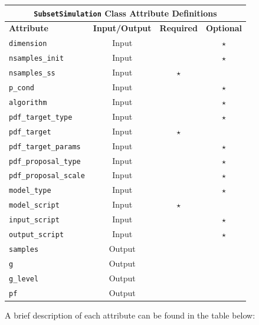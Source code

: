 \begin{center}
	\begin{tabular}{ |l|c|c|c| } 
				\hline
		\multicolumn{4}{|c|}{\texttt{SubsetSimulation} Class Attribute Definitions} \\
		\hline
		\textbf{Attribute} & \textbf{Input/Output} & \textbf{Required} & \textbf{Optional} \\
		\hline
		\texttt{dimension} & Input &  & $\star$  \\ 
		\hline
        \texttt{nsamples\_init}& Input &  &  $\star$  \\ 
		\hline
        \texttt{nsamples\_ss}& Input & $\star$ &    \\ 
		\hline
        \texttt{p\_cond}& Input &  &  $\star$  \\ 
		\hline
        \texttt{algorithm} & Input &  & $\star$  \\ 
		\hline
		\texttt{pdf\_target\_type}& Input &  &  $\star$  \\ 
		\hline
		\texttt{pdf\_target} & Input & $\star$ &   \\ 
		\hline
		\texttt{pdf\_target\_params} & Input  & &  $\star$  \\ 
		\hline
		\texttt{pdf\_proposal\_type} & Input & & $\star$   \\ 
		\hline
		\texttt{pdf\_proposal\_scale} & Input &  & $\star$  \\ 
		\hline
		\texttt{model\_type}& Input &  &   $\star$ \\ 
		\hline
		\texttt{model\_script}& Input & $\star$ &    \\ 
		\hline
		\texttt{input\_script}& Input &  & $\star$   \\ 
		\hline
		\texttt{output\_script}& Input &  & $\star$   \\ 
		\hline
		\texttt{samples} & Output & & \\
		\hline
		\texttt{g} & Output & & \\
		\hline
		\texttt{g\_level} & Output & & \\
		\hline
		\texttt{pf} & Output & & \\
		\hline
	\end{tabular}%
\end{center}


\noindent
A brief description of each attribute can be found in the table below:

